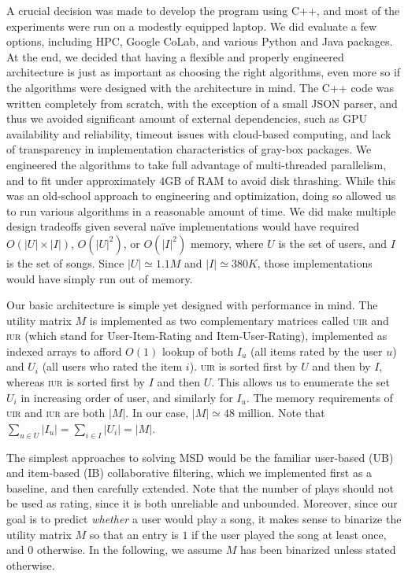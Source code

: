 \documentclass[conference]{IEEEtran}
\begin{document}
A crucial decision was made to develop the program using C++, and most
of the experiments were run on a modestly equipped laptop.
We did evaluate a few options, including HPC, Google CoLab,
and various Python and Java packages. At the end, we decided that having a
flexible and properly engineered architecture is just as important as
choosing the right algorithms,
even more so if the algorithms were designed with
the architecture in mind. The C++ code was written completely from scratch,
with the exception of a small JSON parser, and thus we avoided significant
amount of external dependencies, such as GPU availability and
reliability, timeout issues with cloud-based
computing, and lack of transparency in implementation characteristics
of gray-box packages.
We engineered the algorithms
to take full advantage of multi-threaded parallelism, and to fit under
approximately $4$GB of RAM to avoid disk thrashing. While this was an
old-school approach to engineering and optimization, doing so allowed us
to run various algorithms in a reasonable amount of time.
We did
make multiple design tradeoffs given several
naïve
implementations would have required
$O(|U|\times |I|)$, $O(|U|^2)$, or $O(|I|^2)$
memory, where $U$ is the set of users, and $I$ is the set of
songs. Since $|U| \simeq 1.1M$ and $|I| \simeq 380K$, those implementations
would have simply run out of memory.

Our basic architecture is simple yet designed with performance in mind.
The utility matrix $M$ is implemented as two complementary matrices
called \textsc{uir} and \textsc{iur} (which stand for User-Item-Rating
and Item-User-Rating), implemented as indexed arrays to afford
$O(1)$ lookup of both $I_u$ (all items rated by the user $u$) and $U_i$
(all users who rated the item $i$). \textsc{uir} is sorted first by $U$ and then
by $I$, whereas \textsc{iur} is sorted first by $I$ and then $U$. This allows
us to enumerate the set $U_i$ in increasing order of user, and similarly for
$I_u$.
The memory requirements of \textsc{uir} and
\textsc{iur} are both $|M|$. In our case,
$|M| \simeq 48$ million.
Note that $\sum_{u\in U} |I_u| = \sum_{i\in I} |U_i| = |M|$.

The simplest approaches to solving MSD would be the familiar user-based
(UB) and item-based (IB) collaborative filtering, which we implemented first
as a baseline, and then carefully extended. 
Note that
the number of plays should not be used as rating, since it is both
unreliable and unbounded. Moreover, since our goal is to predict
{\em whether} a user would play a song, it makes sense to binarize the
utility matrix $M$ so that an entry is $1$ if
the user played the song at least once, and $0$ otherwise.
In the following, we assume $M$ has been binarized unless stated otherwise.
\end{document}
